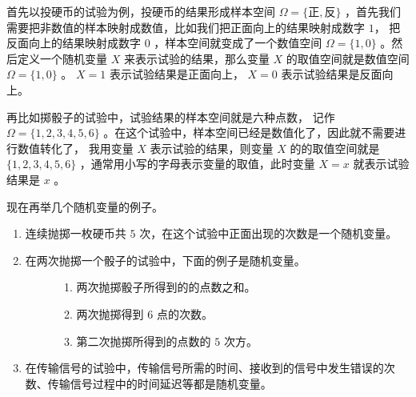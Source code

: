 \documentclass[letterpaper,10pt,english]{sphinxmanual}
\begin{document}
首先以投硬币的试验为例，投硬币的结果形成样本空间 \(\Omega=\{\text{正},\text{反}\}\)
，首先我们需要把非数值的样本映射成数值，比如我们把正面向上的结果映射成数字 \(1\)，
把反面向上的结果映射成数字 \(0\) ，样本空间就变成了一个数值空间 \(\Omega=\{1,0\}\)
。然后定义一个随机变量 \(X\) 来表示试验的结果，那么变量 \(X\) 的取值空间就是数值空间 \(\Omega=\{1,0\}\)
。 \(X=1\) 表示试验结果是正面向上， \(X=0\) 表示试验结果是反面向上。

再比如掷骰子的试验中，试验结果的样本空间就是六种点数，
记作 \(\Omega=\{1,2,3,4,5,6\}\)
。在这个试验中，样本空间已经是数值化了，因此就不需要进行数值转化了，
我用变量 \(X\) 表示试验的结果，则变量 \(X\) 的的取值空间就是 \(\{1,2,3,4,5,6\}\)
，通常用小写的字母表示变量的取值，此时变量 \(X=x\) 就表示试验结果是 \(x\)
。

现在再举几个随机变量的例子。
\begin{enumerate}
%
\item {} 
连续抛掷一枚硬币共 \(5\) 次，在这个试验中正面出现的次数是一个随机变量。

\item {} \begin{description}
\item[{在两次抛掷一个骰子的试验中，下面的例子是随机变量。}] \leavevmode\begin{enumerate}
%
\item {} 
两次抛掷骰子所得到的的点数之和。

\item {} 
两次抛掷得到 \(6\) 点的次数。

\item {} 
第二次抛掷所得到的点数的 \(5\) 次方。

\end{enumerate}

\end{description}

\item {} 
在传输信号的试验中，传输信号所需的时间、接收到的信号中发生错误的次数、传输信号过程中的时间延迟等都是随机变量。

\end{enumerate}
\end{document}
